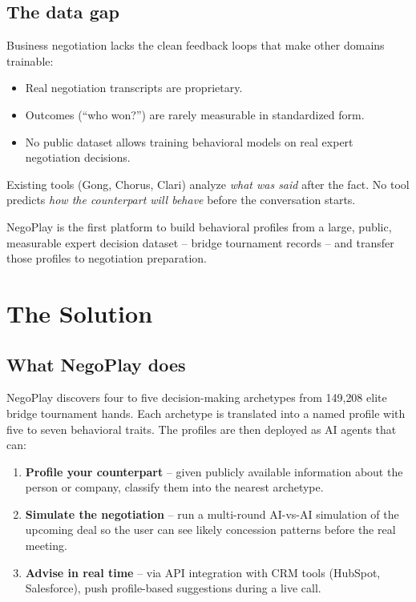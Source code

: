 \documentclass[11pt, a4paper, oneside]{report}
\begin{document}
\section{The data gap}

Business negotiation lacks the clean feedback loops that make other
domains trainable:

\begin{itemize}[leftmargin=*]
    \item Real negotiation transcripts are proprietary.
    \item Outcomes (``who won?'') are rarely measurable in standardized form.
    \item No public dataset allows training behavioral models on real expert
          negotiation decisions.
\end{itemize}

Existing tools (Gong, Chorus, Clari) analyze \emph{what was said} after
the fact. No tool predicts \emph{how the counterpart will behave} before
the conversation starts.

\begin{keybox}
NegoPlay is the first platform to build behavioral profiles from a large,
public, measurable expert decision dataset -- bridge tournament records --
and transfer those profiles to negotiation preparation.
\end{keybox}

\chapter{The Solution}
\label{ch:solution}

\section{What NegoPlay does}

NegoPlay discovers four to five decision-making archetypes from 149{,}208
elite bridge tournament hands. Each archetype is translated into a
named profile with five to seven behavioral traits. The profiles are then
deployed as AI agents that can:

\begin{enumerate}[leftmargin=*]
    \item \textbf{Profile your counterpart} -- given publicly available
          information about the person or company, classify them into the
          nearest archetype.
    \item \textbf{Simulate the negotiation} -- run a multi-round
          AI-vs-AI simulation of the upcoming deal so the user can see
          likely concession patterns before the real meeting.
    \item \textbf{Advise in real time} -- via API integration with CRM
          tools (HubSpot, Salesforce), push profile-based suggestions
          during a live call.
\end{enumerate}
\end{document}
